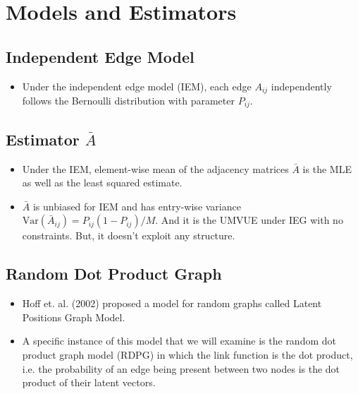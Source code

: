 \documentclass[a4paper]{article}
\begin{document}
\section{Models and Estimators}


\subsection{Independent Edge Model}
\begin{itemize}
\item Under the independent edge model (IEM), each edge $A_{ij}$ independently follows the Bernoulli distribution with parameter $P_{ij}$.
\end{itemize}

\subsection{Estimator $\bar{A}$}
\begin{itemize}
\item Under the IEM, element-wise mean of the adjacency matrices $\bar{A}$ is the MLE as well as the least squared estimate.
\item $\bar{A}$ is unbiased for IEM and has entry-wise variance $\mathrm{Var}(\bar{A}_{ij}) = P_{ij} (1-P_{ij})/M$. And it is the UMVUE under IEG with no constraints. But, it doesn't exploit any structure. 
\end{itemize}

\subsection{Random Dot Product Graph}
\begin{itemize}
\item Hoff et. al. (2002) proposed a model for random graphs called Latent Positions Graph Model.
\item A specific instance of this model that we will examine is the random dot product graph model (RDPG) in which the link function is the dot product, i.e. the probability of an edge being present between two nodes is the dot product of their latent vectors.
\end{itemize}
\end{document}
